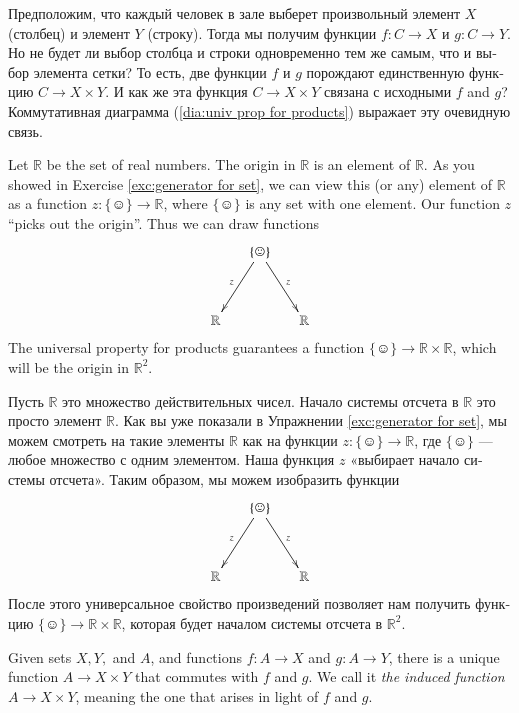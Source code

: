 \documentclass[a4paper]{book}
\def\RR{{\mathbb R}}
\def\singleton{\{\smiley\}}
\def\to{\rightarrow}
\def\taking{\colon}
\theoremstyle{myth}
\newtheorem{remarkENG}[envENG]{\begin{english}Remark\end{english}}
\newtheorem{exampleENG}[envENG]{\begin{english}Example\end{english}}
\newtheorem{exampleRUS}[envRUS]{\begin{russian}Пример\end{russian}}
\begin{document}
\begin{english}
\begin{exampleRUS}
\begin{russian}
Предположим, что каждый человек в зале выберет произвольный элемент $X$ (столбец) и элемент $Y$ (строку). Тогда мы получим функции $f\taking C\to X$ и $g\taking C\to Y$. Но не будет ли выбор столбца и строки одновременно тем же самым, что и выбор элемента сетки? То есть, две функции $f$ и $g$ порождают единственную функцию $C\to X\times Y$. И как же эта функция $C\to X\times Y$ связана с исходными $f$ and $g$? Коммутативная диаграмма (\ref{dia:univ prop for products}) выражает эту очевидную связь. \end{russian}
\end{exampleRUS}

\begin{exampleENG}
Let $\RR$ be the set of real numbers. The origin in $\RR$ is an element of $\RR$. As you showed in Exercise \ref{exc:generator for set}, we can view this (or any) element of $\RR$ as a function $z\taking\singleton\to\RR$, where $\singleton$ is any set with one element. Our function $z$ “picks out the origin”. Thus we can draw functions 
$$\xymatrix@=15pt{&\singleton\ar[ddr]^z\ar[ddl]_z\\\\\RR&&\RR}
$$
The universal property for products guarantees a function $\singleton\to\RR\times\RR$, which will be the origin in $\RR^2.$
\end{exampleENG}

\begin{exampleRUS}
\begin{russian}Пусть $\RR$ это множество действительных чисел. Начало системы отсчета в $\RR$ это просто элемент $\RR$. Как вы уже показали в Упражнении \ref{exc:generator for set}, мы можем смотреть на такие элементы $\RR$ как на функции $z\taking\singleton\to\RR$, где $\singleton$ — любое множество с одним элементом. Наша функция $z$ «выбирает начало системы отсчета». Таким образом, мы можем изобразить функции 
$$\xymatrix@=15pt{&\singleton\ar[ddr]^z\ar[ddl]_z\\\\\RR&&\RR}
$$
После этого универсальное свойство произведений позволяет нам получить функцию $\singleton\to\RR\times\RR$, которая будет началом системы отсчета в $\RR^2.$ \end{russian}
\end{exampleRUS}

\begin{remarkENG}
Given sets $X, Y,$ and $A$, and functions $f\taking A\to X$ and $g\taking A\to Y$, there is a unique function $A\to X\times Y$ that commutes with $f$ and $g$. We call it {\em the induced function $A\to X\times Y$}, meaning the one that arises in light of $f$ and $g$.
\end{remarkENG}


\end{english}
\end{document}

